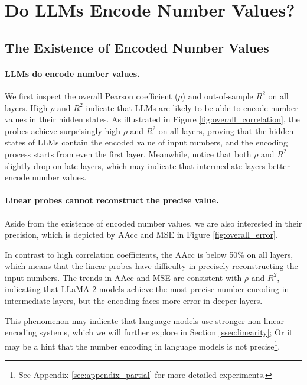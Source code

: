 \documentclass[11pt]{article}
\begin{document}
\section{Do LLMs Encode Number Values?}
\subsection{The Existence of Encoded Number Values}
\label{ssec:number_existence}
\paragraph{LLMs do encode number values.}
We first inspect the overall Pearson coefficient ($\rho$) and out-of-sample $R^2$ on all layers.
High $\rho$ and $R^2$ indicate that LLMs are likely to be able to encode number values in their hidden states.
As illustrated in Figure \ref{fig:overall_correlation}, the probes achieve surprisingly high $\rho$ and $R^2$ on all layers, proving that the hidden states of LLMs contain the encoded value of input numbers, and the encoding process starts from even the first layer.
Meanwhile, notice that both $\rho$ and $R^2$ slightly drop on late layers, which may indicate that intermediate layers better encode number values.

\paragraph{Linear probes cannot reconstruct the precise value.}
Aside from the existence of encoded number values, we are also interested in their precision, which is depicted by AAcc and MSE in Figure \ref{fig:overall_error}.

In contrast to high correlation coefficients, the AAcc is below 50\% on all layers, which means that the linear probes have difficulty in precisely reconstructing the input numbers.
The trends in AAcc and MSE are consistent with $\rho$ and $R^2$, indicating that LLaMA-2 models achieve the most precise number encoding in intermediate layers, but the encoding faces more error in deeper layers.

This phenomenon may indicate that language models use stronger non-linear encoding systems, which we will further explore in Section \ref{ssec:linearity};
Or it may be a hint that the number encoding in language models is not precise\footnote{See Appendix \ref{sec:appendix_partial} for more detailed experiments.}.
\end{document}
